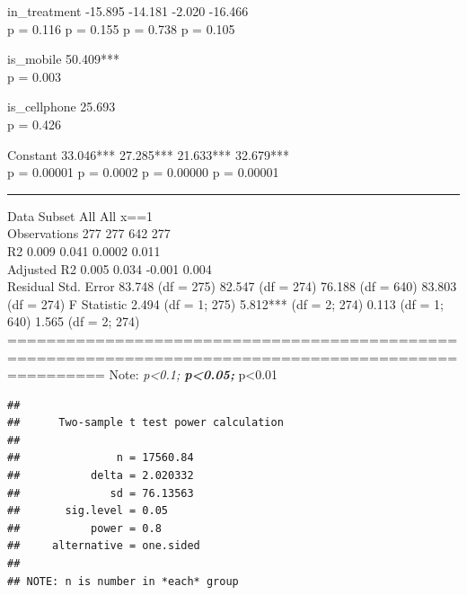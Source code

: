 \documentclass[
]{article}
\newenvironment{Shaded}{\begin{snugshade}}{\end{snugshade}}
\newcommand{\DataTypeTok}[1]{\textcolor[rgb]{0.13,0.29,0.53}{#1}}
\newcommand{\DecValTok}[1]{\textcolor[rgb]{0.00,0.00,0.81}{#1}}
\newcommand{\FloatTok}[1]{\textcolor[rgb]{0.00,0.00,0.81}{#1}}
\newcommand{\KeywordTok}[1]{\textcolor[rgb]{0.13,0.29,0.53}{\textbf{#1}}}
\newcommand{\NormalTok}[1]{#1}
\newcommand{\OperatorTok}[1]{\textcolor[rgb]{0.81,0.36,0.00}{\textbf{#1}}}
\newcommand{\OtherTok}[1]{\textcolor[rgb]{0.56,0.35,0.01}{#1}}
\newcommand{\StringTok}[1]{\textcolor[rgb]{0.31,0.60,0.02}{#1}}
\begin{document}
in\_treatment -15.895 -14.181 -2.020 -16.466\\
p = 0.116 p = 0.155 p = 0.738 p = 0.105

is\_mobile 50.409***\\
p = 0.003

is\_cellphone 25.693\\
p = 0.426

Constant 33.046*** 27.285*** 21.633*** 32.679***\\
p = 0.00001 p = 0.0002 p = 0.00000 p = 0.00001

\begin{center}\rule{0.5\linewidth}{\linethickness}\end{center}

Data Subset All All x==1\\
Observations 277 277 642 277\\
R2 0.009 0.041 0.0002 0.011\\
Adjusted R2 0.005 0.034 -0.001 0.004\\
Residual Std. Error 83.748 (df = 275) 82.547 (df = 274) 76.188 (df =
640) 83.803 (df = 274) F Statistic 2.494 (df = 1; 275) 5.812*** (df = 2;
274) 0.113 (df = 1; 640) 1.565 (df = 2; 274)
======================================================================================================
Note: \emph{p\textless0.1; \textbf{p\textless0.05; }}p\textless0.01

\begin{Shaded}
\end{Shaded}

\begin{verbatim}
## 
##      Two-sample t test power calculation 
## 
##               n = 17560.84
##           delta = 2.020332
##              sd = 76.13563
##       sig.level = 0.05
##           power = 0.8
##     alternative = one.sided
## 
## NOTE: n is number in *each* group
\end{verbatim}
\end{document}
